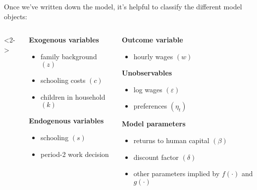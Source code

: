 \documentclass[aspectratio=169]{beamer}
\begin{document}
\begin{frame}\frametitle{}

Once we've written down the model, it's helpful to classify the different model objects:
\bigskip{}


\begin{columns}<2->
\begin{column}{0.5\textwidth}
\textbf{Exogenous variables}
\begin{itemize}
    \item family background $(z)$
    \item schooling costs $(c)$
    \item children in household $(k)$
\end{itemize}

\textbf{Endogenous variables}
\begin{itemize}
    \item schooling $(s)$
    \item period-2 work decision
\end{itemize}
\end{column}
\begin{column}{0.5\textwidth}
\bigskip{}
\bigskip{}

\textbf{Outcome variable}
\begin{itemize}
    \item hourly wages $(w)$
\end{itemize}

\textbf{Unobservables}
\begin{itemize}
    \item log wages $(\varepsilon)$
    \item preferences $(\eta_t)$
\end{itemize}

\textbf{Model parameters}
\begin{itemize}
    \item returns to human capital $(\beta)$
    \item discount factor $(\delta)$
    \item other parameters implied by $f(\cdot)$ and $g(\cdot)$
\end{itemize}
\end{column}
\end{columns}

\end{frame}
\end{document}
